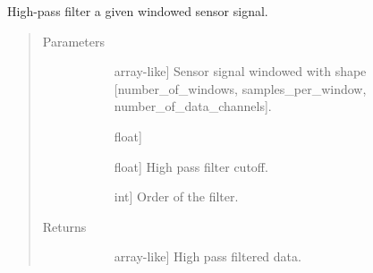 \documentclass[letterpaper,10pt,english]{sphinxmanual}
\begin{document}
\begin{fulllineitems}
\label{\detokenize{index:sleeppy.utils.high_pass_filter}}
High-pass filter a given windowed sensor signal.
\begin{quote}\begin{description}
\item[{Parameters}] \leavevmode\begin{description}
\item[{}] \leavevmode{[}array-like{]}
Sensor signal windowed with shape {[}number\_of\_windows, samples\_per\_window, number\_of\_data\_channels{]}.

\item[{}] \leavevmode{[}float{]}
\item[{}] \leavevmode{[}float{]}
High pass filter cutoff.

\item[{}] \leavevmode{[}int{]}
Order of the filter.

\end{description}

\item[{Returns}] \leavevmode\begin{description}
\item[{}] \leavevmode{[}array-like{]}
High pass filtered data.

\end{description}

\end{description}\end{quote}

\end{fulllineitems}

\end{document}

